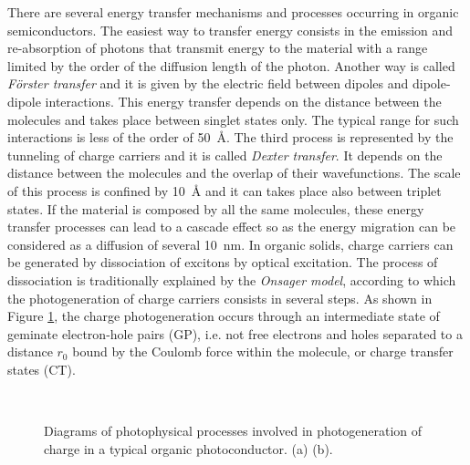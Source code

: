 \documentclass  [
  paper    = a4,
  BCOR     = 10mm,
  twoside,
  fontsize = 12pt,
  fleqn,
  toc      = bibnumbered,
  toc      = listofnumbered,
  numbers  = noendperiod,
  headings = normal,
  listof   = leveldown,
  version  = 3.03
]                                       {scrreprt}
\begin{document}
There are several energy transfer mechanisms and processes occurring in organic semiconductors. The easiest way to transfer energy consists in the emission and re-absorption of photons that transmit energy to the material with a range limited by the order of the diffusion length of the photon. Another way is called \emph{F\"{o}rster transfer} and it is given by the electric field between dipoles and dipole-dipole interactions. This energy transfer depends on the distance between the molecules and takes place between singlet states only. The typical range for such interactions is less of the order of \SI{50}{\angstrom}. The third process is represented by the tunneling of charge carriers and it is called \emph{Dexter transfer}. It depends on the distance between the molecules and the overlap of their wavefunctions. The scale of this process is confined by \SI{10}{\angstrom} and it can takes place also between triplet states. If the material is composed by all the same molecules, these energy transfer processes can lead to a cascade effect so as the energy migration can be considered as a diffusion of several \SI{10}{\nano\meter}. In organic solids, charge carriers can be generated by dissociation of excitons by optical excitation. The process of dissociation is traditionally explained by the \emph{Onsager model}\cite{art:onsager}, according to which the photogeneration of charge carriers consists in several steps. As shown in Figure \ref{fig:carriers}, the charge photogeneration occurs through an intermediate state of geminate electron-hole pairs (GP), i.e. not free electrons and holes separated to a distance $r_0$ bound by the Coulomb force within the molecule, or charge transfer states (CT). 
\begin{figure}[t]
	\centering%
	\quad
	\\
		\caption{\footnotesize Diagrams of photophysical processes involved in photogeneration of charge in a typical organic photoconductor. (a)\cite{art:onsager} (b).}
	\label{fig:carriers}
\end{figure}
\end{document}
